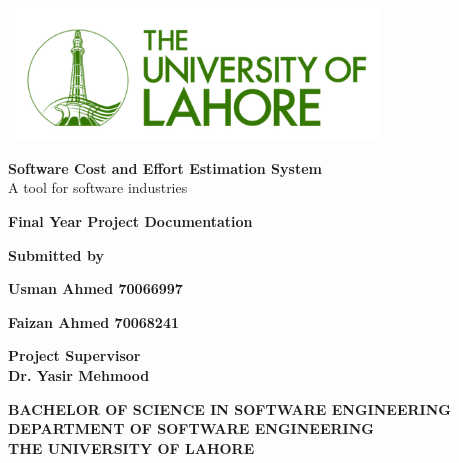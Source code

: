\graphicspath{ {./images/} }



\begin{center}
	\vspace{10mm}

	\includegraphics[height=3.5cm, width=10cm]{logo} \\
	\vspace{10mm}

	\Huge{\textbf{Software Cost and Effort Estimation System}} \\
	\huge{A tool for software industries}
	\vspace{10mm}

	\Huge{\textbf{Final Year Project Documentation}} \\
	\vspace{20mm}

	\Large{\textbf{Submitted by}} \\
	\vspace{15mm}

	\Large{\textbf{Usman Ahmed \hspace{3cm} 70066997}}

	\vspace{1mm}

	\Large{\textbf{Faizan Ahmed \hspace{3cm} 70068241}}

	\vspace{10mm}

	\Large{\textbf{Project Supervisor}} \\
	\vspace{3mm}
	\Large{\textbf{Dr. Yasir Mehmood}}

	\vspace{15mm}


	\Large{\textbf{BACHELOR OF SCIENCE IN SOFTWARE ENGINEERING}} \\
	\vspace{10mm}
	\Large{\textbf{DEPARTMENT OF SOFTWARE ENGINEERING}} \\
	\vspace{3mm}
	\Large{\textbf{THE UNIVERSITY OF LAHORE}} \\






\end{center}


\pagebreak